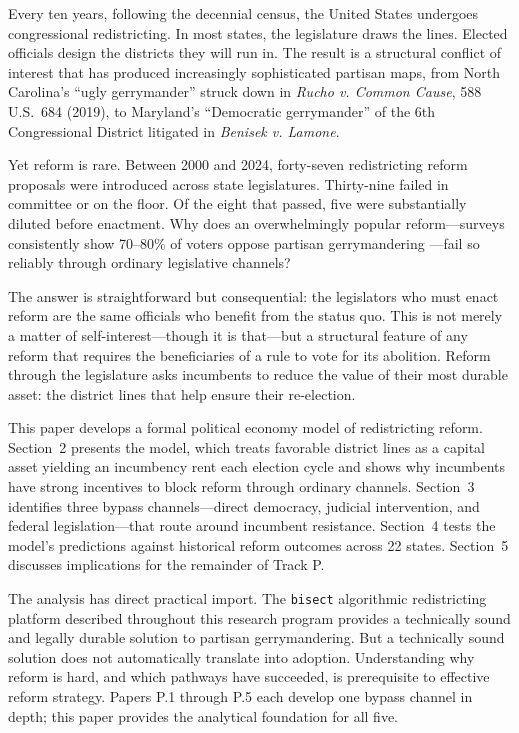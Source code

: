 Every ten years, following the decennial census, the United States undergoes congressional redistricting. In most states, the legislature draws the lines. Elected officials design the districts they will run in. The result is a structural conflict of interest that has produced increasingly sophisticated partisan maps, from North Carolina's ``ugly gerrymander'' struck down in \textit{Rucho v. Common Cause}, 588 U.S.\ 684 (2019), to Maryland's ``Democratic gerrymander'' of the 6th Congressional District litigated in \textit{Benisek v. Lamone}.

Yet reform is rare. Between 2000 and 2024, forty-seven redistricting reform proposals were introduced across state legislatures. Thirty-nine failed in committee or on the floor. Of the eight that passed, five were substantially diluted before enactment. Why does an overwhelmingly popular reform---surveys consistently show 70--80\% of voters oppose partisan gerrymandering \citep{gallup2019}---fail so reliably through ordinary legislative channels?

The answer is straightforward but consequential: the legislators who must enact reform are the same officials who benefit from the status quo. This is not merely a matter of self-interest---though it is that---but a structural feature of any reform that requires the beneficiaries of a rule to vote for its abolition. Reform through the legislature asks incumbents to reduce the value of their most durable asset: the district lines that help ensure their re-election.

This paper develops a formal political economy model of redistricting reform. Section~2 presents the model, which treats favorable district lines as a capital asset yielding an incumbency rent each election cycle and shows why incumbents have strong incentives to block reform through ordinary channels. Section~3 identifies three bypass channels---direct democracy, judicial intervention, and federal legislation---that route around incumbent resistance. Section~4 tests the model's predictions against historical reform outcomes across 22 states. Section~5 discusses implications for the remainder of Track P.

The analysis has direct practical import. The \texttt{bisect} algorithmic redistricting platform described throughout this research program provides a technically sound and legally durable solution to partisan gerrymandering. But a technically sound solution does not automatically translate into adoption. Understanding why reform is hard, and which pathways have succeeded, is prerequisite to effective reform strategy. Papers P.1 through P.5 each develop one bypass channel in depth; this paper provides the analytical foundation for all five.
